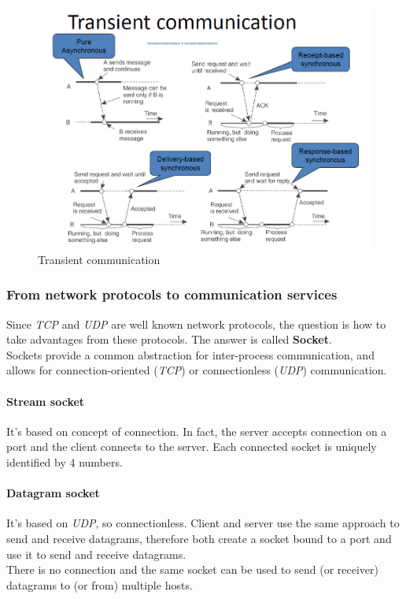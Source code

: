 \begin{figure}[h]
    \caption{Transient communication}
    \includegraphics[width=\textwidth]{src/images/communication/transient-communication.png}
    \centering
\end{figure}

\subsubsection{From network protocols to communication services}

Since \textit{TCP} and \textit{UDP} are well known network protocols, the question is how to take advantages from these protocols. The answer is called \textbf{Socket}.\\
Sockets provide a common abstraction for inter-process communication, and allows for connection-oriented (\textit{TCP}) or connectionless (\textit{UDP}) communication.

\paragraph{Stream socket}

It's based on concept of connection. In fact, the server accepts connection on a port and the client connects to the server. Each connected socket is uniquely identified by 4 numbers.

\paragraph{Datagram socket}

It's based on \textit{UDP}, so connectionless. Client and server use the same approach to send and receive datagrams, therefore both create a socket bound to a port and use it to send and receive datagrams.\\
There is no connection and the same socket can be used to send (or receiver) datagrams to (or from) multiple hosts.

